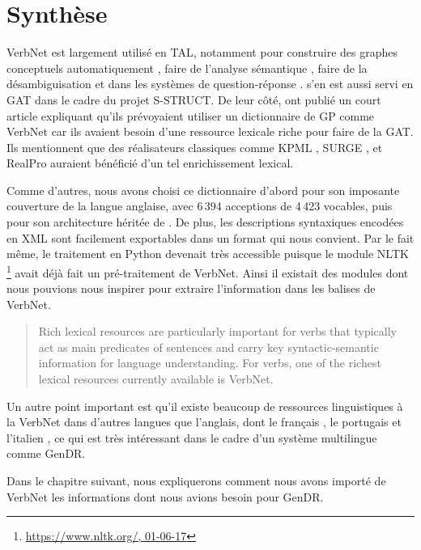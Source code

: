 
\section{Synthèse}

VerbNet est largement utilisé en \ac{TAL}, notamment pour construire des graphes conceptuels automatiquement \citep{HensmanAutomaticallyBuildingConceptual2004}, faire de l'analyse sémantique \citep{Shi:2005:PPT:2132047.2132058}, faire de la désambiguisation \citep{AbendSupervisedAlgorithmVerb2008} et dans les systèmes de question-réponse \citep{DBLP:conf/nlpke/WenJH08}. \citep{PfeilAlgorithmsResourcesScalable2016} s'en est aussi servi en \ac{GAT} dans le cadre du projet S-STRUCT. De leur côté, \cite{MilleLargeCoverageDetailed2015} ont publié un court article expliquant qu'ils prévoyaient utiliser un dictionnaire de \ac{GP} comme VerbNet car ils avaient besoin d'une ressource lexicale riche pour faire de la \ac{GAT}. Ils mentionnent que des réalisateurs classiques comme KPML \citep{BatemanEnablingTechnologyMultilingual1997}, SURGE \citep{Elhadad98surge:a}, et RealPro \citep{LavoieFastPortableRealizer1997} auraient bénéficié d'un tel enrichissement lexical.

Comme d'autres, nous avons choisi ce dictionnaire d'abord pour son imposante couverture de la langue anglaise, avec 6\,394 acceptions de 4\,423 vocables, puis pour son architecture héritée de \cite{verb-classes.levin.1993}. De plus, les descriptions syntaxiques encodées en XML sont facilement exportables dans un format qui nous convient. Par le fait même, le traitement en Python devenait très accessible puisque le module NLTK \footnote{\url{https://www.nltk.org/, 01-06-17}} avait déjà fait un pré-traitement de VerbNet. Ainsi il existait des modules dont nous pouvions nous inspirer pour extraire l'information dans les balises de VerbNet.

\begin{quote}
Rich lexical resources are particularly important for verbs that typically act as main predicates of sentences and carry key syntactic-semantic information for language understanding. For verbs, one of the richest lexical resources currently available is VerbNet. 
 \end{quote}
 \vspace{-\baselineskip}
 \hfill
 \cite{Majewska2017}

Un autre point important est qu'il existe beaucoup de ressources linguistiques à la VerbNet dans d'autres langues que l'anglais, dont le français \citep{danlos:hal-01179175}, le portugais \citep{ScartoncrosslinguisticVerbNetstylelexicon} et l'italien \citep{BussoItalianVerbNetConstructionbased}, ce qui est très intéressant dans le cadre d'un système multilingue comme GenDR.

Dans le chapitre suivant, nous expliquerons comment nous avons importé de VerbNet les informations dont nous avions besoin pour GenDR.